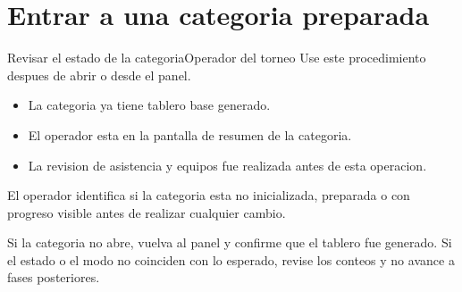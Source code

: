 \section{Entrar a una categoria preparada}


\begin{procedimiento}{Revisar el estado de la categoria}{Operador del torneo}
Use este procedimiento despues de abrir  o  desde el panel.
\end{procedimiento}

\begin{precondiciones}
\begin{itemize}
    \item La categoria ya tiene tablero base generado.
    \item El operador esta en la pantalla de resumen de la categoria.
    \item La revision de asistencia y equipos fue realizada antes de esta operacion.
\end{itemize}
\end{precondiciones}


\begin{resultadoesperado}
El operador identifica si la categoria esta no inicializada, preparada o con progreso visible antes de realizar cualquier cambio.
\end{resultadoesperado}

\begin{fallas}
Si la categoria no abre, vuelva al panel y confirme que el tablero fue generado. Si el estado o el modo no coinciden con lo esperado, revise los conteos y no avance a fases posteriores.
\end{fallas}

